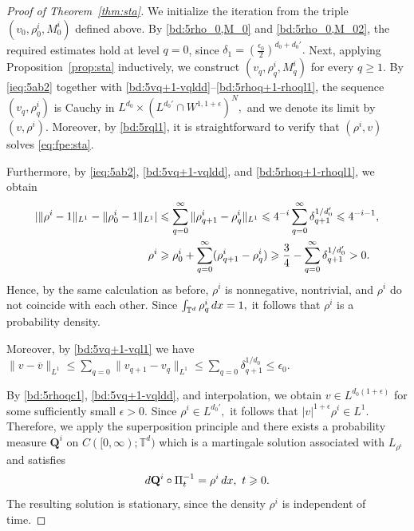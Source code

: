 \documentclass[10pt,a4paper]{amsart}
\numberwithin{equation}{section}
\def\dif{{\mathord{{\rm d}}}}
\def\geq{\geqslant}
\def\leq{\leqslant}
\def\dif{{\mathord{{\rm d}}}}
\def\geq{\geqslant}
\def\leq{\leqslant}
\begin{document}
 \begin{proof}[Proof of Theorem~\ref{thm:sta}]
We initialize the iteration from the triple
$
(v_0,\rho^i_0,M^i_0)
$
defined above.
By \eqref{bd:5rho_0,M_0} and \eqref{bd:5rho_0,M_02}, the required estimates hold at level $q=0$, since
$
\delta_1=(\frac{\epsilon_0}{2})^{d_0+d_0'}.
$ 
Next, applying Proposition~\ref{prop:sta} inductively, we construct
$
(v_q,\rho^i_q,M^i_q)
$
for every
$
q\geq1.
$
By \eqref{ieq:5ab2} together with
\eqref{bd:5vq+1-vqldd}--\eqref{bd:5rhoq+1-rhoql1}, the sequence
$
 (v_q,\rho^i_q) 
$
is Cauchy in
$
L^{d_0}\times (L^{d_0'}\cap W^{1,1+\epsilon})^N,
$
and we denote its limit by
$
(v,\rho^i).
$
Moreover, by \eqref{bd:5rql1}, it is straightforward to verify that
$
(\rho^i,v)
$
solves \eqref{eq:fpe:sta}.

Furthermore, by \eqref{ieq:5ab2},
\eqref{bd:5vq+1-vqldd}, and
\eqref{bd:5rhoq+1-rhoql1}, we obtain
\begin{align}
|\|\rho^i-1\|_{L^1}-\|\rho^i_0-1\|_{L^1}|
&\leq
\sum_{q=0}^\infty
\|\rho^i_{q+1}-\rho^i_q\|_{L^1}
\leq
 4^{-i}\sum_{q=0}^\infty
\delta_{q+1}^{1/d_0'}\leq 4^{-i-1}
,
\notag\\
\rho^i
&\geq
\rho^i_0
+
\sum_{q=0}^\infty
(\rho^i_{q+1}-\rho^i_q)
\geq
\frac34
-
\sum_{q=0}^\infty
\delta_{q+1}^{1/d_0'}
>0.
\notag
\end{align}
Hence, by the same calculation as before, $\rho^i$ is nonnegative, nontrivial, and $\rho^i$
 do not coincide with each other.
Since
$
\int_{\mathbb{T}^d}\rho_q^i\,\dif x=1,
$
it follows that $\rho^i$ is a probability density.

Moreover, by \eqref{bd:5vq+1-vql1}  we have $  \|v -\overline v\|_{L^{1}}\leq\sum_{q=0}  \|v_{q+1}-v_{q}\|_{L^{1}}\leq \sum_{q=0}\delta_{q+1}^{1/d_0}
 \leq \epsilon_0. $ 

By \eqref{bd:5rhoqc1}, \eqref{bd:5vq+1-vqldd}, and interpolation, we obtain
$
v\in L^{d_0(1+\epsilon)}
$
for some sufficiently small
$
\epsilon>0.
$
Since
$
\rho^i\in L^{d_0'},
$
it follows that
$
|v|^{1+\epsilon}\rho^i\in L^1.
$
Therefore, we apply the superposition principle
\cite[Section~7.2]{Tre14}
 and there exists a probability measure
$
\mathbf{Q}^i
$
on
$
C([0,\infty);\mathbb{T}^d)
$
which is a martingale solution associated with $L_{\rho^i}$ and satisfies
\begin{align*}
\dif \mathbf{Q}^i\circ\Pi_t^{-1}
=
\rho^i\,\dif x,
\ 
t\geq0.
\end{align*}
The resulting solution is stationary, since the density $\rho^i$ is independent of time.
\end{proof}
\end{document}

